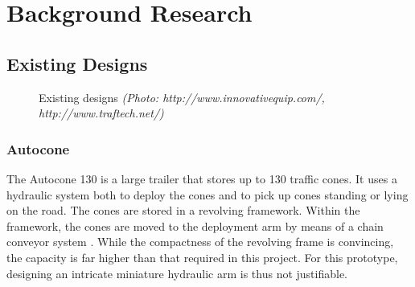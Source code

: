 \documentclass[11pt]{report}
\newcommand{\credit}[1]{\textit{(Photo: #1)}}
\begin{document}
\section{Background Research}

\subsection{Existing Designs}

\begin{figure}
  \centering
  \hspace{20pt}                
   \caption{Existing designs \credit{http://www.innovativequip.com/, http://www.traftech.net/}}
  \label{fig:exisitingdesigns}
\end{figure}

\subsubsection{Autocone}
The Autocone 130 is a large trailer that stores up to 130 traffic cones. It uses a hydraulic system both to deploy the cones and to pick up cones standing or lying on the road. The cones are stored in a revolving framework. Within the framework, the cones are moved to the deployment arm by means of a chain conveyor system \cite{HowItsMade-Autocone}. While the compactness of the revolving frame is convincing, the capacity is far higher than that required in this project. For this prototype, designing an intricate miniature hydraulic arm is thus not justifiable.
\end{document}
